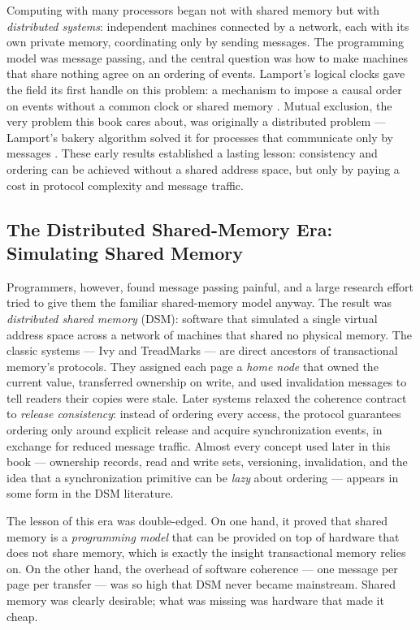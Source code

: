 Computing with many processors began not with shared memory but with
\emph{distributed systems}: independent machines connected by a network, each
with its own private memory, coordinating only by sending messages. The
programming model was message passing, and the central question was how to
make machines that share nothing agree on an ordering of events. Lamport's
logical clocks gave the field its first handle on this problem: a mechanism
to impose a causal order on events without a common clock or shared memory
\cite{lamport78}. Mutual exclusion, the very problem this book cares about,
was originally a distributed problem --- Lamport's bakery algorithm solved it
for processes that communicate only by messages \cite{lamport74bakery}. These
early results established a lasting lesson: consistency and ordering can be
achieved without a shared address space, but only by paying a cost in
protocol complexity and message traffic.

\subsection{The Distributed Shared-Memory Era: Simulating Shared Memory}

Programmers, however, found message passing painful, and a large research
effort tried to give them the familiar shared-memory model anyway. The result
was \emph{distributed shared memory} (DSM): software that simulated a single
virtual address space across a network of machines that shared no physical
memory. The classic systems --- Ivy \cite{li89dsm} and TreadMarks
\cite{amza96treadmarks} --- are direct ancestors of transactional memory's
protocols. They assigned each page a \emph{home node} that owned the current
value, transferred ownership on write, and used invalidation messages to tell
readers their copies were stale. Later systems relaxed the coherence contract
to \emph{release consistency}: instead of ordering every access, the protocol
guarantees ordering only around explicit release and acquire synchronization
events, in exchange for reduced message traffic.
Almost every concept used later in this book --- ownership records, read and
write sets, versioning, invalidation, and the idea that a synchronization
primitive can be \emph{lazy} about ordering --- appears in some form in the
DSM literature.

The lesson of this era was double-edged. On one hand, it proved that shared
memory is a \emph{programming model} that can be provided on top of hardware
that does not share memory, which is exactly the insight transactional memory
relies on. On the other hand, the overhead of software coherence --- one
message per page per transfer --- was so high that DSM never became
mainstream. Shared memory was clearly desirable; what was missing was hardware
that made it cheap.

